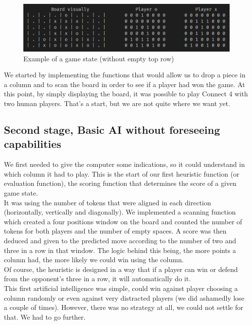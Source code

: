 \documentclass[12pt, a4paper, oneside]{report}
\begin{document}
	\begin{figure}[h]
		\includegraphics[scale=0.4]{example.png}
		\centering
		\caption{Example of a game state (without empty top row)}\label{fig:example_game_state}
	\end{figure}

	We started by implementing the functions that would allow us to drop a piece in a column and to scan the board in order to see if a player had won the game. At this point, by simply displaying the board, it was possible to play Connect 4 with two human players. That’s a start, but we are not quite where we want yet. \\

	\subsection{Second stage, Basic AI without foreseeing capabilities}

	We first needed to give the computer some indications, so it could understand in which column it had to play. This is the start of our first heuristic function (or evaluation function), the scoring function that determines the score of a given game state. \\
	It was using the number of tokens that were aligned in each direction (horizontally, vertically and diagonally). We implemented a scanning function which created a four positions window on the board and counted the number of tokens for both players and the number of empty spaces. A score was then deduced and given to the predicted move according to the number of two and three in a row in that window. The logic behind this being, the more points a column had, the more likely we could win using the column. \\
	Of course, the heuristic is designed in a way that if a player can win or defend from the opponent’s three in a row, it will automatically do it. \\

	This first artificial intelligence was simple, could win against player choosing a column randomly or even against very distracted players (we did ashamedly lose a couple of times). However, there was no strategy at all, we could not settle for that. We had to go further. \\
\end{document}
